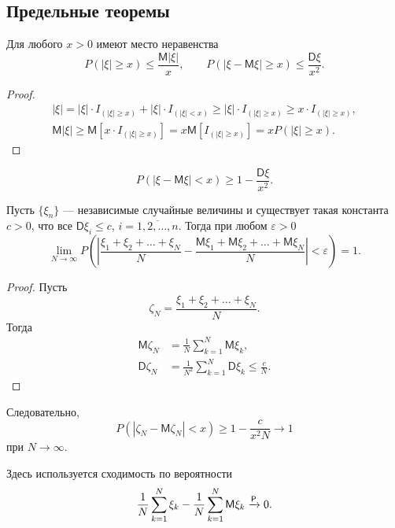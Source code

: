 \subsection{Предельные теоремы}
\begin{theorem}
Для любого $ x > 0 $ имеют место неравенства 
\[
		P(|\xi|\geqslant x) \leqslant \frac{\mathsf M |\xi|}{x}, \qquad
		P(|\xi-\mathsf M\xi|\geqslant x) \leqslant \frac{\mathsf D\xi}{x^2}.
\]
\end{theorem}
\begin{proof}
	\begin{gather*}
		|\xi| = |\xi|\cdot I_{(|\xi| \geqslant x)} + |\xi| \cdot I_{(|\xi|<x)}
		\geqslant |\xi| \cdot I_{(|\xi|\geqslant x)} \geqslant x \cdot I_{(|\xi|
		\geqslant x)},\\
		\mathsf M|\xi| \geqslant \mathsf M \left[ x\cdot I_{(|\xi|\geqslant x)}
		\right] = x \mathsf M \left[ I_{(|\xi| \geqslant x)} \right]  = x P(|\xi|
		\geqslant x).
  \end{gather*}
\end{proof}

\begin{corollary*} 
\[
		P(|\xi-\mathsf M\xi|< x) \geqslant 1 - \frac{\mathsf D\xi}{x^2}.
\]
\end{corollary*}

\begin{theorem}
	Пусть $ \{\xi_n\} $ --- независимые случайные величины и существует
	такая константа $ c > 0 $, что все $\mathsf D \xi_i \leqslant c$,
	$i=\overline{1,2,\ldots, n}$. Тогда при любом $ \varepsilon > 0 $  
	\[
		\lim_{N\to\infty} P \left( \left| \frac{\xi_1 + \xi_2 + \ldots +
		\xi_N}{N} - \frac{\mathsf M \xi_1 + \mathsf M\xi_2 + \ldots + \mathsf
	M\xi_N}{N} \right| < \varepsilon \right) = 1.
	\]
\end{theorem}
\begin{proof}
  Пусть  
  \[
  		\zeta_N = \frac{\xi_1 + \xi_2 + \ldots + \xi_N}{N}.
  \]
  Тогда
	\begin{align*}
		\mathsf M \zeta_N &= \frac{1}{N}\sum_{k=1}^N \mathsf M\xi_k,\\
		\mathsf D\zeta_N &= \frac{1}{N^2}\sum_{k=1}^N \mathsf D \xi_k \leqslant
		\frac{c}{N}.
  \end{align*}
\end{proof}
Следовательно, 
\[
		P(|\zeta_N - \mathsf M\zeta_N| < x) \geqslant 1 - \frac{c}{x^2N} \to 1
\]
при $ N \to \infty $. 

Здесь используется сходимость по вероятности 
\[
	\frac{1}{N}\sum_{k=1}^N \xi_k -\frac{1}{N} \sum_{k=1}^N \mathsf M\xi_k \xrightarrow[]{\mathsf P} 0.
\]



